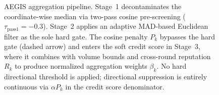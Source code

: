 \documentclass[10pt, conference]{IEEEtran}
\begin{document}
\begin{figure}[!t]

\caption{AEGIS aggregation pipeline. Stage~1 decontaminates the 
coordinate-wise median via two-pass cosine pre-screening 
($\tau_{\text{pass1}} = -0.3$). Stage~2 applies an adaptive 
MAD-based Euclidean filter as the sole hard gate. The cosine 
penalty $P_k$ bypasses the hard gate (dashed arrow) and enters 
the soft credit score in Stage~3, where it combines with volume 
bounds and cross-round reputation $R_k$ to produce normalized 
aggregation weights $\beta_k$. No hard directional threshold is 
applied; directional suppression is entirely continuous via 
$\alpha P_k$ in the credit score denominator.}
\label{fig:aegis-arch}
\end{figure}
\end{document}
